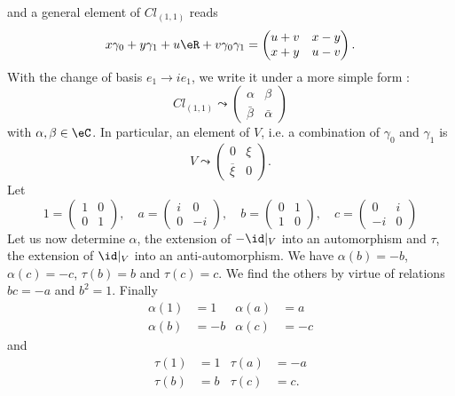 and a general element of $Cl_{(1,1)}$ reads
\[ 
  x\gamma_0+y\gamma_1+u\eR+v\gamma_0\gamma_1=
\begin{pmatrix}
u+v&x-y\\
x+y&u-v
\end{pmatrix}.
\]
With the change of basis $e_1\to ie_1$, we write it under a more simple form :
\begin{equation}
Cl_{(1,1)}\leadsto 
\begin{pmatrix}
\alpha&\beta\\
\bar\beta&\bar\alpha
\end{pmatrix}
\end{equation}
with $\alpha,\beta\in\eC$. In particular, an element of $V$, i.e. a combination of $\gamma_0$ and $\gamma_1$ is
\begin{equation}
V\leadsto
\begin{pmatrix}
0&\xi\\
\overline{\xi}&0
\end{pmatrix}.
\end{equation}
Let
\[ 
  1=
\begin{pmatrix}
1&0\\0&1
\end{pmatrix},
\quad
a=
\begin{pmatrix}
i&0\\0&-i
\end{pmatrix},
\quad b=
\begin{pmatrix}
0&1\\1&0
\end{pmatrix},
\quad
c=
\begin{pmatrix}
0&i\\-i&0
\end{pmatrix}
\]
Let us now determine $\alpha$, the extension of $-\id|_V$ into an automorphism and $\tau$, the extension of $\id|_V$ into an anti-automorphism. We have $\alpha(b)=-b$, $\alpha(c)=-c$, $\tau(b)=b$ and $\tau(c)=c$. We find the others by virtue of relations $bc=-a$ and $b^2=1$. Finally
\begin{equation}
\begin{aligned}
  \alpha(1)&=1&\alpha(a)&=a\\
\alpha(b)&=-b&\alpha(c)&=-c
\end{aligned}
\end{equation}
and
\begin{equation}
\begin{aligned}
  \tau(1)&=1&\tau(a)&=-a\\
\tau(b)&=b&\tau(c)&=c.
\end{aligned}
\end{equation}

